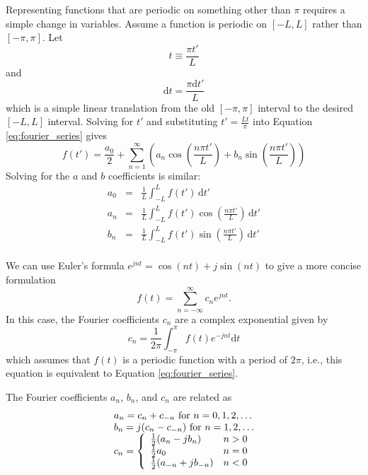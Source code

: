 Representing functions that are periodic on something other than $\pi$ requires a simple change in variables. Assume a function is periodic on $[-L, L]$ rather than $[-\pi, \pi]$. Let 
\begin{equation}
t \equiv \frac{\pi t'}{L}
\end{equation} and 
\begin{equation}
\mathrm{d}t = \frac{\pi \mathrm{d}t'}{L}
\end{equation} which is a simple linear translation from the old $[-\pi, \pi]$ interval to the desired $[-L, L]$ interval.
Solving for $t'$ and substituting $t' = \frac{L t}{\pi}$ into Equation \ref{eq:fourier_series} gives
\begin{equation}
f(t') = \frac{a_0}{2} + \displaystyle\sum\limits_{n=1}^{\infty} (a_n \cos (\frac{n \pi t'}{L}) + b_n \sin(\frac{n \pi t'}{L}))
\end{equation} Solving for the $a$ and $b$ coefficients is similar:
\begin{equation}
\begin{array} {lcl} 
a_0 & = & \frac{1}{L} \int_{-L}^L f(t')\,\mathrm{d}t' \\
a_n & = & \frac{1}{L} \int_{-L}^L f(t') \cos(\frac{n \pi t'}{L})\,\mathrm{d}t' \\
b_n & = & \frac{1}{L} \int_{-L}^L f(t') \sin(\frac{n \pi t'}{L})\,\mathrm{d}t' \\
\end{array}
\end{equation}

We can use Euler's formula $e^{j n t} = \cos (n t) + j \sin (n t)$ to give a more concise formulation 
\begin{equation}
f(t) = \displaystyle\sum\limits_{n=-\infty}^{\infty} c_n e^{j n t}.
\end{equation} In this case, the Fourier coefficients $c_n$ are a complex exponential given by
\begin{equation}
c_n = \frac{1}{2 \pi} \int_{-\pi}^{\pi} f(t) e^{-j n t} \mathrm{d}t
\end{equation} which assumes that $f(t)$ is a periodic function with a period of $2\pi$, i.e., this equation is equivalent to Equation \ref{eq:fourier_series}. 

The Fourier coefficients $a_n$, $b_n$, and $c_n$ are related as
\begin{equation}
\begin{array} {lcl} 
a_n = c_n + c_{-n} \text{ for } n = 0,1,2, \dots \\
b_n = j(c_n - c_{-n}) \text{ for } n = 1,2, \dots \\
c_n = \left\{ 
  \begin{array}{l l }
  	\frac{1}{2} (a_n - j b_n) & n > 0 \\
	
	\frac{1}{2} a_0 & n = 0 \\
	\frac{1}{2} (a_{-n} + j b_{-n}) & n < 0 \\
  \end{array} \right .\\
\end{array}
\end{equation}

